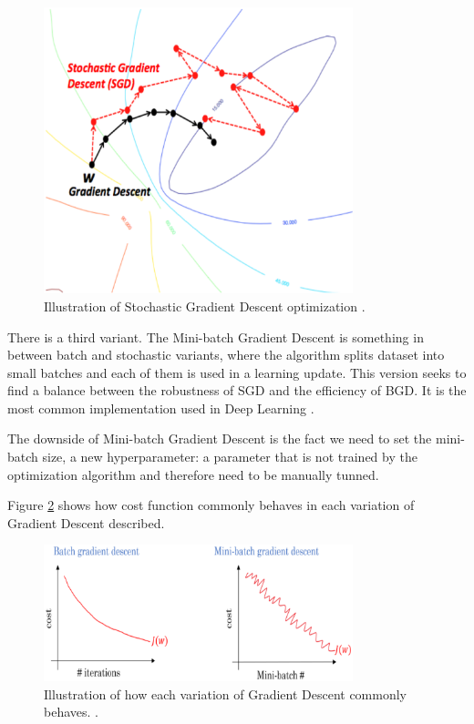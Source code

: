 \begin{figure}[!htbp]
	\centering
	\includegraphics[width=0.8\textwidth]{Cap3/batchvsstochastic.eps}
	\caption{Illustration of 	Stochastic Gradient Descent optimization \cite{soni2018}.
	}
	\label{fig:batchvsstochastic}
\end{figure}


There is a third variant. The Mini-batch Gradient Descent is something in between batch and stochastic variants, where the algorithm splits dataset into small batches and each of them is used in a learning update. This version seeks to find a balance between the robustness of SGD and the efficiency of BGD. It is the most common implementation used in Deep Learning \cite{brownlee2017}. 

The downside of Mini-batch Gradient Descent is the fact we need to set the mini-batch size, a new hyperparameter: a parameter that is not trained by the optimization algorithm and therefore need to be manually tunned.

Figure \ref{fig:lossfunctiongdvariants} shows how cost function commonly behaves in each variation of Gradient Descent described.

\begin{figure}[!htbp]
	\centering
	\includegraphics[width=0.8\textwidth]{Cap3/lossfunctiongdvariants.eps}
	\caption{Illustration of how each variation of Gradient Descent commonly behaves.
		\cite{dabbura2017}.
	}
	\label{fig:lossfunctiongdvariants}
\end{figure}

